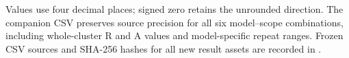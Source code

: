 \noindent\begin{minipage}{\linewidth}\footnotesize Values use four decimal places; signed zero retains the unrounded direction. The companion CSV preserves source precision for all six model--scope combinations, including whole-cluster R and A values and model-specific repeat ranges. Frozen CSV sources and SHA-256 hashes for all new result assets are recorded in .
\end{minipage}\par
\endgroup
